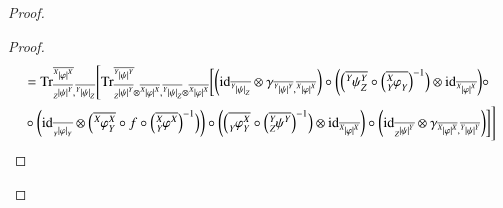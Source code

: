 \documentclass{amsart}
\def\tn{\textnormal}
\def\Trace{\tn{Tr}}
\def\ol{\overline}
\def\id{\tn{id}}
\newcommand{\feeddd}[3]{{\tensor*[^{#2}_{\color{white}{!}}]{{|#1|}}{^{#3}}}}%
\newcommand{\feeddc}[3]{{\tensor*[^{#2}]{{|#1|}}{_{#3}}}}
\newcommand{\feedcd}[3]{{\tensor*[_{#2}]{{|#1|}}{^{#3}}}}
\newcommand{\feedcc}[3]{{\tensor*[^{\color{white}{!}}_{#2}]{{|#1|}}{_{#3}}}}
\newcommand{\feedda}[3]{{\tensor*[^{#2}_{\color{white}{!}}]{{#1}}{^{#2}_{#3}}}}
\newcommand{\feedca}[3]{{\tensor*[_{#2}]{{#1}}{_{#2}^{#3}}}}
\newcommand{\feedad}[3]{{\tensor*[^{#2}_{#3}]{{#1}}{^{#2}}}}
\newcommand{\feedac}[3]{{\tensor*[_{#2}^{#3}]{{#1}}{_{#2}}}}
\theoremstyle{remark}
\theoremstyle{definition}
\begin{document}
\begin{proof}
\begin{proof}
\begin{align*}
&=\Trace^{\ol{\feeddd{\varphi}{X}{X}}}_{\ol{\feedcd{\psi}{Z}{Y}},\ol{\feeddc{\psi}{Y}{Z}}}\Bigg[
\Trace^{\ol{\feeddd{\psi}{Y}{Y}}}_{\ol{\feedcd{\psi}{Z}{Y}}\otimes\ol{\feeddd{\varphi}{X}{X}},\ol{\feeddc{\psi}{Y}{Z}}\otimes\ol{\feeddd{\varphi}{X}{X}}}\bigg[
\bigg(\id_{\ol{\feeddc{\psi}{Y}{Z}}}\otimes\gamma_{\ol{\feeddd{\psi}{Y}{Y}},\ol{\feeddd{\varphi}{X}{X}}}\bigg)\circ\bigg(\Big(\ol{\feedda{\psi}{Y}{Z}}\circ\Big(\ol{\feedac{\varphi}{Y}{X}}\Big)^{-1}\Big)\otimes\id_{\ol{\feeddd{\varphi}{X}{X}}}\bigg)\circ\\
&\circ\bigg(\id_{\ol{\feedcc{\varphi}{Y}{Y}}}\otimes\Big(\ol{\feedda{\varphi}{X}{Y}}\circ f\circ\Big(\ol{\feedad{\varphi}{X}{Y}}\Big)^{-1}\Big)\bigg)\circ\bigg(\Big(\ol{\feedca{\varphi}{Y}{X}}\circ\Big(\ol{\feedad{\psi}{Y}{Z}}\Big)^{-1}\Big)\otimes\id_{\ol{\feeddd{\varphi}{X}{X}}}\bigg)\circ\bigg(\id_{\ol{\feedcd{\psi}{Z}{Y}}}\otimes\gamma_{\ol{\feeddd{\varphi}{X}{X}},\ol{\feeddd{\psi}{Y}{Y}}}\bigg)\bigg]\Bigg]\\
\end{align*}


\end{proof}
\end{proof}
\end{document}
